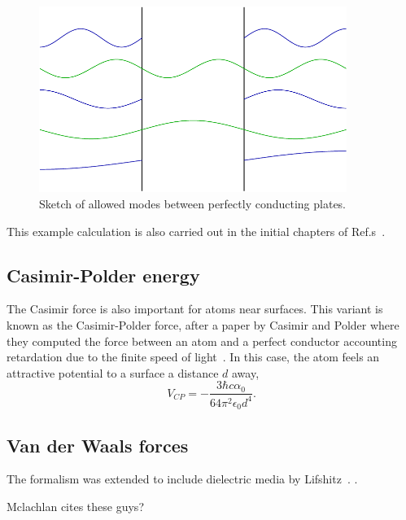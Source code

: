 \begin{figure}
\center
\includegraphics[width=10cm]{fig/intro/twoplanes_wave}
\caption{Sketch of allowed modes between perfectly conducting plates.}
\end{figure}

This example calculation is also carried out in the initial chapters of Ref.s~\cite{Milton2001,Bordag2009,Dalvit2011}.

\subsection{Casimir-Polder energy}

The Casimir force is also important for atoms near surfaces.  
This variant is known as the Casimir-Polder force, 
after a paper by Casimir and Polder where they computed the force between an 
atom and a perfect conductor accounting retardation due to the finite speed 
of light~\cite{CasimirPolder1948}.  
In this case, the atom feels an attractive potential to a surface a distance $d$ away,
\begin{equation}
V_{CP} =-\frac{3\hbar c\alpha_0}{64\pi^2\epsilon_0 d^4}.
\end{equation}


\subsection{Van der Waals forces}

The formalism was extended to include dielectric media by Lifshitz~\cite{Lifshitz1956}.
  .  

Mclachlan\cite{McLachlan1963} cites these guys?


